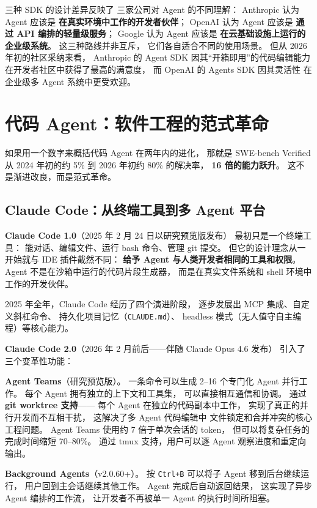 三种 SDK 的设计差异反映了
三家公司对 Agent 的不同理解：
Anthropic 认为 Agent 应该是
\textbf{在真实环境中工作的开发者伙伴}；
OpenAI 认为 Agent 应该是
\textbf{通过 API 编排的轻量级服务}；
Google 认为 Agent 应该是
\textbf{在云基础设施上运行的企业级系统}。
这三种路线并非互斥，
它们各自适合不同的使用场景。
但从 2026 年初的社区采纳来看，
Anthropic 的 Agent SDK 因其“开箱即用”的代码编辑能力
在开发者社区中获得了最高的满意度，
而 OpenAI 的 Agents SDK 因其灵活性
在企业级多 Agent 系统中更受欢迎。


\section{代码 Agent：软件工程的范式革命}
\label{sec:code-agents-revolution}

如果用一个数字来概括代码 Agent 在两年内的进化，
那就是 SWE-bench Verified 从 2024 年初的约 5\%
到 2026 年初约 80\% 的解决率，
\textbf{16 倍的能力跃升}。
这不是渐进改良，而是范式革命。

\subsection{Claude Code：从终端工具到多 Agent 平台}

\textbf{Claude Code 1.0}（2025 年 2 月 24 日以研究预览版发布）
最初只是一个终端工具：
能对话、编辑文件、运行 bash 命令、管理 git 提交。
但它的设计理念从一开始就与 IDE 插件截然不同：
\textbf{给予 Agent 与人类开发者相同的工具和权限}。
Agent 不是在沙箱中运行的代码片段生成器，
而是在真实文件系统和 shell 环境中工作的开发伙伴。

2025 年全年，Claude Code 经历了四个演进阶段，
逐步发展出 MCP 集成、自定义斜杠命令、
持久化项目记忆（\texttt{CLAUDE.md}）、
headless 模式（无人值守自主编程）等核心能力。

\textbf{Claude Code 2.0}（2026 年 2 月前后——伴随 Claude Opus 4.6 发布）
引入了三个变革性功能：

\textbf{Agent Teams}（研究预览版）。
一条命令可以生成 2--16 个专门化 Agent 并行工作。
每个 Agent 拥有独立的上下文和工具集，
可以直接相互通信和协调。
通过 \textbf{git worktree 支持}——
每个 Agent 在独立的代码副本中工作，
实现了真正的并行开发而不互相干扰，
这解决了多 Agent 代码编辑中
文件锁定和合并冲突的核心工程问题。
Agent Teams 使用约 7 倍于单次会话的 token，
但可以将复杂任务的完成时间缩短 70--80\%。
通过 tmux 支持，用户可以逐 Agent 观察进度和重定向输出。

\textbf{Background Agents}（v2.0.60+）。
按 \texttt{Ctrl+B} 可以将子 Agent 移到后台继续运行，
用户回到主会话继续其他工作。
Agent 完成后自动返回结果，
这实现了异步 Agent 编排的工作流，
让开发者不再被单一 Agent 的执行时间所阻塞。

